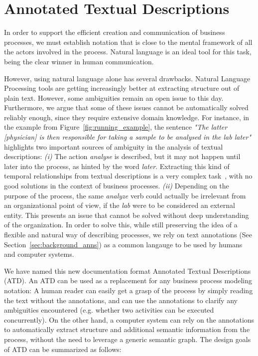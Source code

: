\section{Annotated Textual Descriptions}
\label{sec:atd_atd}

In order to support the efficient creation and communication of business
processes, we must establish notation that is close to the mental framework of
all the actors involved in the process. Natural language is an ideal tool for
this task, being the clear winner in human communication.


However, using natural language alone has several drawbacks. Natural Language
Processing tools are getting increasingly better at extracting structure out of
plain text. However, some ambiguities remain an open issue to this day.
Furthermore, we argue that some of these issues cannot be automatically solved
reliably enough, since they require extensive domain knowledge. For instance, in
the example from  Figure~\ref{fig:running_example}, the sentence \emph{"The
  latter [physician] is then responsible for taking a sample to be analysed in
  the lab later"} highlights two important sources of ambiguity in the analysis
of textual descriptions: \emph{(i)} The action \emph{analyse} is described, but
it may not happen until later into the process, as hinted by the word
\emph{later}. Extracting this kind of temporal relationships from textual
descriptions is a very complex task~\cite{Mirza16}, with no good solutions in
the context of business processes. \emph{(ii)} Depending on the purpose of the
process, the same \emph{analyze} verb could actually be irrelevant from an
organizational point of view, if the {\em lab} were to be considered an external
entity. This presents an issue that cannot be solved without deep understanding
of the organization. In order to solve this, while still preserving the idea of
a flexible and natural way of describing processes, we rely on text annotations
(See Section~\ref{sec:background_anns}) as a common langauge to be used by
humans and computer systems.

We have named this new documentation format Annotated Textual Descriptions
(ATD). An ATD can be used as a replacement for any business process modeling
notation: A human reader can easily get a grasp of the process by simply reading
the text without the annotations, and can use the annotations to clarify any
ambiguities encountered (e.g. whether two activities can be executed
concurrently). On the other hand, a computer system can rely on the annotations
to automatically extract structure and additional semantic information from the
process, without the need to leverage a generic semantic graph\cite{PadroS12}.
The design goals of ATD can be summarized as follows:


